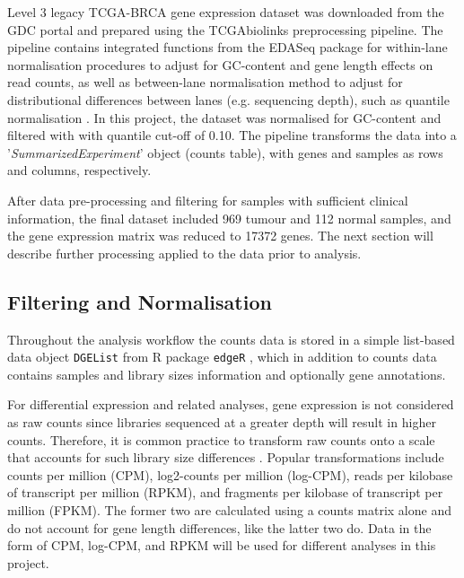     Level 3 legacy TCGA-BRCA gene expression dataset was downloaded from the GDC portal and prepared using the TCGAbiolinks preprocessing pipeline. The pipeline contains integrated functions from the EDASeq package \cite{risso2011gc} for within-lane normalisation procedures to adjust for GC-content and gene length effects on read counts, as well as between-lane normalisation method to adjust for distributional differences between lanes (e.g. sequencing depth), such as quantile normalisation \cite{Colaprico2016, PapaleoTCGAPackages}. 
    In this project, the dataset was normalised for GC-content and filtered with with quantile cut-off of 0.10. The pipeline transforms the data into a '\textit{SummarizedExperiment}' \cite{Huber2015OrchestratingBioconductor} object (counts table), with genes and samples as rows and columns, respectively. 
    
        
    After data pre-processing and filtering for samples with sufficient clinical information, the final dataset included 969 tumour and 112 normal samples, and  the gene expression matrix was reduced to 17372 genes. The next section will describe further processing applied to the data prior to analysis. 
    
    
    \subsection{Filtering and Normalisation}
    
   Throughout the analysis workflow the counts data is stored in a simple list-based data object \texttt{DGEList} from R package \texttt{edgeR} \cite{Robinson2010EdgeR:Data}, which in addition to counts data contains samples and library sizes information and optionally gene annotations. 

    For differential expression and related analyses, gene expression is not considered as raw counts since libraries sequenced at a greater depth will result in higher counts. Therefore, it is common practice to transform raw counts onto a scale that accounts for such library size differences \cite{law2016rna}. Popular transformations include counts per million (CPM), log2-counts per million (log-CPM), reads per kilobase of transcript per million (RPKM), and fragments per kilobase of transcript per million (FPKM). The former two are calculated using a counts matrix alone and do not account for gene length differences, like the latter two do. Data in the form of CPM, log-CPM, and RPKM will be used for different analyses in this project. 
    
